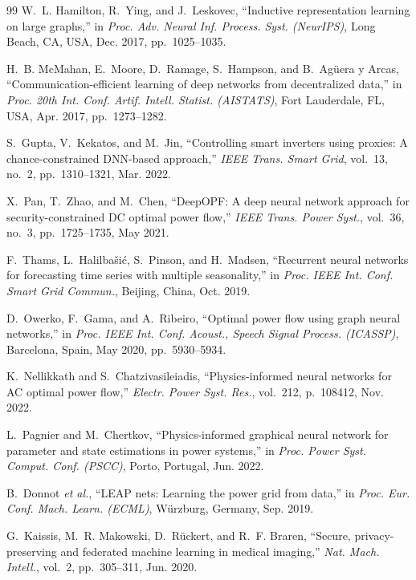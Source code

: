 \documentclass[journal,10pt]{IEEEtran}
\begin{document}
\begin{thebibliography}{99}
W.~L. Hamilton, R.~Ying, and J.~Leskovec, ``Inductive representation learning on large graphs,'' in \emph{Proc. Adv. Neural Inf. Process. Syst. (NeurIPS)}, Long Beach, CA, USA, Dec. 2017, pp.~1025--1035.

H.~B. McMahan, E.~Moore, D.~Ramage, S.~Hampson, and B.~Agüera y Arcas, ``Communication-efficient learning of deep networks from decentralized data,'' in \emph{Proc. 20th Int. Conf. Artif. Intell. Statist. (AISTATS)}, Fort Lauderdale, FL, USA, Apr. 2017, pp.~1273--1282.

S.~Gupta, V.~Kekatos, and M.~Jin, ``Controlling smart inverters using proxies: A chance-constrained DNN-based approach,'' \emph{IEEE Trans. Smart Grid}, vol.~13, no.~2, pp.~1310--1321, Mar. 2022.

X.~Pan, T.~Zhao, and M.~Chen, ``DeepOPF: A deep neural network approach for security-constrained DC optimal power flow,'' \emph{IEEE Trans. Power Syst.}, vol.~36, no.~3, pp.~1725--1735, May 2021.

F.~Thams, L.~Halilbašić, S.~Pinson, and H.~Madsen, ``Recurrent neural networks for forecasting time series with multiple seasonality,'' in \emph{Proc. IEEE Int. Conf. Smart Grid Commun.}, Beijing, China, Oct. 2019.

D.~Owerko, F.~Gama, and A.~Ribeiro, ``Optimal power flow using graph neural networks,'' in \emph{Proc. IEEE Int. Conf. Acoust., Speech Signal Process. (ICASSP)}, Barcelona, Spain, May 2020, pp.~5930--5934.

K.~Nellikkath and S.~Chatzivasileiadis, ``Physics-informed neural networks for AC optimal power flow,'' \emph{Electr. Power Syst. Res.}, vol.~212, p.~108412, Nov. 2022.

L.~Pagnier and M.~Chertkov, ``Physics-informed graphical neural network for parameter and state estimations in power systems,'' in \emph{Proc. Power Syst. Comput. Conf. (PSCC)}, Porto, Portugal, Jun. 2022.

B.~Donnot \emph{et al.}, ``LEAP nets: Learning the power grid from data,'' in \emph{Proc. Eur. Conf. Mach. Learn. (ECML)}, Würzburg, Germany, Sep. 2019.

G.~Kaissis, M.~R. Makowski, D.~Rückert, and R.~F. Braren, ``Secure, privacy-preserving and federated machine learning in medical imaging,'' \emph{Nat. Mach. Intell.}, vol.~2, pp.~305--311, Jun. 2020.


\end{thebibliography}
\end{document}
